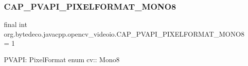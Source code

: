 \subsubsection{\texorpdfstring{C\+A\+P\+\_\+\+P\+V\+A\+P\+I\+\_\+\+P\+I\+X\+E\+L\+F\+O\+R\+M\+A\+T\+\_\+\+M\+O\+N\+O8}{CAP\_PVAPI\_PIXELFORMAT\_MONO8}}
{\footnotesize\ttfamily final int org.\+bytedeco.\+javacpp.\+opencv\+\_\+videoio.\+C\+A\+P\+\_\+\+P\+V\+A\+P\+I\+\_\+\+P\+I\+X\+E\+L\+F\+O\+R\+M\+A\+T\+\_\+\+M\+O\+N\+O8 = 1\hspace{0.3cm}{\ttfamily [static]}}

P\+V\+A\+PI\+: Pixel\+Format enum cv\+:\+: Mono8 